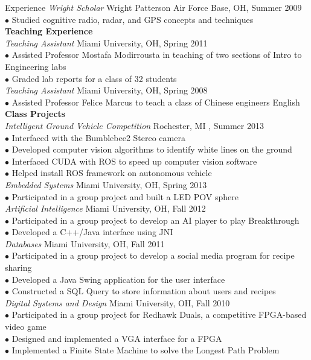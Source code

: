 \documentclass{resume} %
\begin{document}
\begin{rSection}{Experience}
  \textit{Wright Scholar} \hfill Wright Patterson Air Force Base, OH, Summer 2009 \\ [1 mm]
  $\bullet$ Studied cognitive radio, radar, and GPS concepts and techniques \\[3 mm]
  \textbf{Teaching Experience}\\[1 mm]
  \textit{Teaching Assistant} \hfill Miami University, OH, Spring 2011 \\ [1 mm]
  $\bullet$ Assisted Professor Mostafa Modirrousta in teaching of two sections of Intro to Engineering labs\\
  $\bullet$ Graded lab reports for a class of 32 students \\ [3 mm]
  \textit{Teaching Assistant} \hfill Miami University, OH, Spring 2008 \\ [1 mm]
  $\bullet$ Assisted Professor Felice Marcus to teach a class of Chinese engineers English \\[3 mm]
  \textbf{Class Projects}\\[1 mm]
  \textit{Intelligent Ground Vehicle Competition} \hfill Rochester, MI , Summer 2013 \\ [1 mm]
  $\bullet$ Interfaced with the Bumblebee2 Stereo camera \\
  $\bullet$ Developed computer vision algorithms to identify white lines on the ground \\
  $\bullet$ Interfaced CUDA with ROS to speed up computer vision software \\
  $\bullet$ Helped install ROS framework on autonomous vehicle \\[1 mm]
  \textit{Embedded Systems} \hfill Miami University, OH, Spring 2013\\
  $\bullet$ Participated in a group project and built a LED POV sphere\\[1 mm]
  \textit{Artificial Intelligence} \hfill Miami University, OH, Fall 2012\\
  $\bullet$ Participated in a group project to develop an AI player to play Breakthrough\\
  $\bullet$ Developed a C++/Java interface using JNI\\[1 mm]
  \textit{Databases} \hfill Miami University, OH, Fall 2011\\
  $\bullet$ Participated in a group project to develop a social media program for recipe sharing \\
  $\bullet$ Developed a Java Swing application for the user interface \\
  $\bullet$ Constructed a SQL Query to store information about users and recipes\\[1 mm]
  \textit{Digital Systems and Design} \hfill Miami University, OH, Fall 2010\\
  $\bullet$ Participated in a group project for Redhawk Duals, a competitive FPGA-based video game\\
  $\bullet$ Designed and implemented a VGA interface for a FPGA\\
  $\bullet$ Implemented a Finite State Machine to solve the Longest Path Problem\\[1 mm]
\end{rSection}
\end{document}
